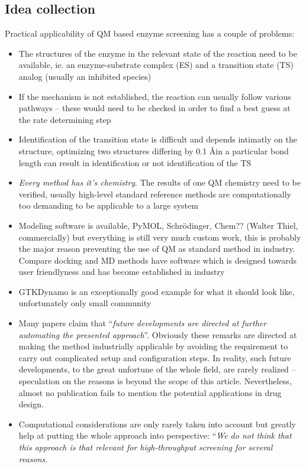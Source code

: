 \subsection{Idea collection}
Practical applicability of QM based enzyme screening has a couple of problems:
\begin{itemize}
\item The structures of the enzyme in the relevant state of the reaction need to be available, ie. an enzyme-substrate complex (ES) and a transition state (TS) analog (usually an inhibited species)
\item If the mechanism is not established, the reaction can usually follow various pathways -- these would need to be checked in order to find a best guess at the rate determining step
\item Identification of the transition state is difficult and depends intimatly on the structure, optimizing two structures differing by 0.1 \AA in a particular bond length can result in identification or not identification of the TS
\item \textit{Every method has it's chemistry}. The results of one QM chemistry need to be verified, usually high-level standard reference methods are computationally too demanding to be applicable to a large system
\item Modeling software is available, PyMOL, Schr\"odinger, Chem?? (Walter Thiel, commercially) but everything is still very much custom work, this is probably the major reason preventing the use of QM as standard method in industry. Compare docking and MD methods have software which is designed towards user friendlyness and has become established in industry
\item GTKDynamo is an exceptionally good example for what it should look like, unfortunately only small community
\item Many papers claim that ``\textit{future developments are directed at further automating the presented approach}''.
Obviously these remarks are directed at making the method industrially applicable by avoiding the requirement to carry out complicated setup and configuration steps\cite{rathore2013advances}.
In reality, such future developments, to the great unfortune of the whole field, are rarely realized -- speculation on the reasons is beyond the scope of this article.
Nevertheless, almost no publication fails to mention the potential applications in drug design.
\item Computational considerations are only rarely taken into account but greatly help at putting the whole approach into perspective: ``\textit{We do not think that this approach is that relevant for high-throughput screening for several reasons.
}
\end{itemize}
